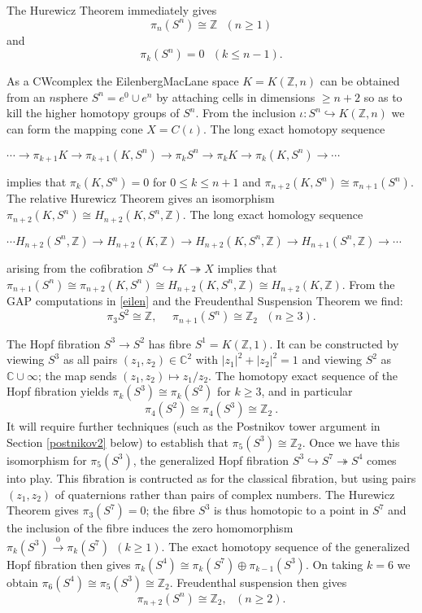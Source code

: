 \documentclass[a4paper,11pt]{report}
\begin{document}
{{The Hurewicz Theorem immediately gives 
\[\pi_n(S^n)\cong \mathbb Z ~~~ (n\ge 1)\]
 and 
\[\pi_k(S^n)=0 ~~~ (k\le n-1).\]
 

As a CW\texttt{}complex the Eilenberg\texttt{}MacLane
space $K=K(\mathbb Z,n)$ can be obtained from an $n$\texttt{}sphere $S^n=e^0\cup e^n$ by attaching cells in dimensions $\ge n+2$ so as to kill the higher homotopy groups of $S^n$. From the inclusion $\iota\colon S^n\hookrightarrow K(\mathbb Z,n)$ we can form the mapping cone $X=C(\iota)$. The long exact homotopy sequence 

$ \cdots \rightarrow \pi_{k+1}K \rightarrow \pi_{k+1}(K,S^n) \rightarrow \pi_{k}
S^n \rightarrow \pi_kK \rightarrow \pi_k(K,S^n) \rightarrow \cdots$ 

 implies that $\pi_k(K,S^n)=0$ for $0 \le k\le n+1$ and $\pi_{n+2}(K,S^n)\cong \pi_{n+1}(S^n)$. The relative Hurewicz Theorem gives an isomorphism $\pi_{n+2}(K,S^n) \cong H_{n+2}(K,S^n,\mathbb Z)$. The long exact homology sequence 

$ \cdots H_{n+2}(S^n,\mathbb Z) \rightarrow H_{n+2}(K,\mathbb Z) \rightarrow
H_{n+2}(K,S^n, \mathbb Z) \rightarrow H_{n+1}(S^n,\mathbb Z) \rightarrow
\cdots$ 

 arising from the cofibration $S^n \hookrightarrow K \twoheadrightarrow X$ implies that $\pi_{n+1}(S^n)\cong \pi_{n+2}(K,S^n) \cong H_{n+2}(K,S^n,\mathbb Z) \cong
H_{n+2}(K,\mathbb Z)$. From the \textsc{GAP} computations in \ref{eilen} and the Freudenthal Suspension Theorem we find: 
\[ \pi_3S^2 \cong \mathbb Z, ~~~~~~ \pi_{n+1}(S^n)\cong \mathbb Z_2~~~(n\ge 3).\]
 

The Hopf fibration $S^3\rightarrow S^2$ has fibre $S^1 = K(\mathbb Z,1)$. It can be constructed by viewing $S^3$ as all pairs $(z_1,z_2)\in \mathbb C^2$ with $|z_1|^2+|z_2|^2=1$ and viewing $S^2$ as $\mathbb C\cup \infty$; the map sends $(z_1,z_2)\mapsto z_1/z_2$. The homotopy exact sequence of the Hopf fibration yields $\pi_k(S^3) \cong \pi_k(S^2)$ for $k\ge 3$, and in particular 
\[\pi_4(S^2) \cong \pi_4(S^3) \cong \mathbb Z_2\ .\]
 It will require further techniques (such as the Postnikov tower argument in
Section \ref{postnikov2} below) to establish that $\pi_5(S^3) \cong \mathbb Z_2$. Once we have this isomorphism for $\pi_5(S^3)$, the generalized Hopf fibration $S^3 \hookrightarrow S^7 \twoheadrightarrow S^4$ comes into play. This fibration is contructed as for the classical fibration,
but using pairs $(z_1,z_2)$ of quaternions rather than pairs of complex numbers. The Hurewicz Theorem
gives $\pi_3(S^7)=0$; the fibre $S^3$ is thus homotopic to a point in $S^7$ and the inclusion of the fibre induces the zero homomorphism $\pi_k(S^3) \stackrel{0}{\longrightarrow} \pi_k(S^7) ~~(k\ge 1)$. The exact homotopy sequence of the generalized Hopf fibration then gives $\pi_k(S^4)\cong \pi_k(S^7)\oplus \pi_{k-1}(S^3)$. On taking $k=6$ we obtain $\pi_6(S^4)\cong \pi_5(S^3) \cong \mathbb Z_2$. Freudenthal suspension then gives 
\[\pi_{n+2}(S^n)\cong \mathbb Z_2,~~~(n\ge 2).\]
 }

}
\end{document}
